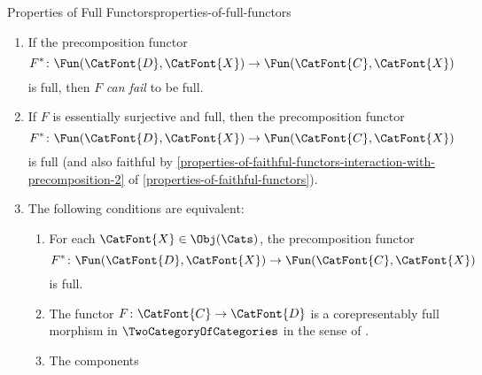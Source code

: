 \begin{proposition}{Properties of Full Functors}{properties-of-full-functors}
\begin{enumerate}
            \[
                F^{*}
                \colon
                \Fun(\CatFont{D},\CatFont{X})
                \to
                \Fun(\CatFont{C},\CatFont{X})
            \]%
            \emph{can fail} to be full.
        \item\label{properties-of-full-functors-interaction-with-precomposition-2}If the precomposition functor
            \[
                F^{*}
                \colon
                \Fun(\CatFont{D},\CatFont{X})
                \to
                \Fun(\CatFont{C},\CatFont{X})
            \]%
            is full, then $F$ \emph{can fail} to be full.
        \item\label{properties-of-full-functors-interaction-with-precomposition-3}If $F$ is essentially surjective and full, then the precomposition functor
            \[
                F^{*}
                \colon
                \Fun(\CatFont{D},\CatFont{X})
                \to
                \Fun(\CatFont{C},\CatFont{X})
            \]%
            is full (and also faithful by \cref{properties-of-faithful-functors-interaction-with-precomposition-2} of \cref{properties-of-faithful-functors}).
        \item\label{properties-of-full-functors-interaction-with-precomposition-4}The following conditions are equivalent:
            \begin{enumerate}
                \item\label{properties-of-full-functors-interaction-with-precomposition-4-a}For each $\CatFont{X}\in\Obj(\Cats)$, the precomposition functor
                    \[
                        F^{*}
                        \colon
                        \Fun(\CatFont{D},\CatFont{X})
                        \to
                        \Fun(\CatFont{C},\CatFont{X})
                    \]%
                    is full.
                \item\label{properties-of-full-functors-interaction-with-precomposition-4-b}The functor $F\colon\CatFont{C}\to\CatFont{D}$ is a corepresentably full morphism in $\TwoCategoryOfCategories$ in the sense of .
                \item\label{properties-of-full-functors-interaction-with-precomposition-4-c}The components

\end{enumerate}
\end{enumerate}
\end{proposition}
